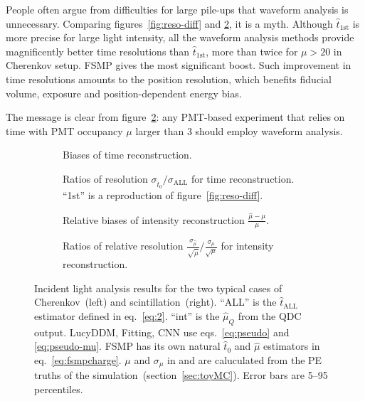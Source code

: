 People often argue from difficulties for large pile-ups that waveform analysis is unnecessary.  Comparing figures~\ref{fig:reso-diff} and \ref{fig:deltamethods}, it is a myth.  Although $\hat{t}_\mathrm{1st}$ is more precise for large light intensity, all the waveform analysis methods provide magnificently better time resolutions than $\hat{t}_\mathrm{1st}$, more than twice for $\mu>20$ in Cherenkov setup.  FSMP gives the most significant boost.  Such improvement in time resolutions amounts to the position resolution, which benefits fiducial volume, exposure and position-dependent energy bias.

The message is clear from figure~\ref{fig:deltamethods}: any PMT-based experiment that relies on time with PMT occupancy $\mu$ larger than 3 should employ waveform analysis.

\begin{figure}[H]
  \begin{subfigure}[b]{\textwidth}
    \centering
    \resizebox{\textwidth}{!}{}
    \caption{\label{fig:biasmethods} Biases of time reconstruction.}
  \end{subfigure}
  \begin{subfigure}[b]{\textwidth}
    \centering
    \resizebox{\textwidth}{!}{}
    \caption{\label{fig:deltamethods} Ratios of resolution $\sigma_{\hat{t}_0}/\sigma_{\mathrm{ALL}}$ for time reconstruction. ``1st'' is a reproduction of figure~\ref{fig:reso-diff}.}
  \end{subfigure}
  \begin{subfigure}[b]{\textwidth}
    \centering
    \resizebox{\textwidth}{!}{}
    \caption{\label{fig:biasmu} Relative biases of intensity reconstruction $\frac{\hat{\mu} - \mu}{\mu}$.}
  \end{subfigure}
  \begin{subfigure}[b]{\textwidth}
    \centering
    \resizebox{\textwidth}{!}{}
    \caption{\label{fig:deltamu} Ratios of relative resolution $\frac{\sigma_{\hat{\mu}}}{\sqrt{\hat{\mu}}}/\frac{\sigma_\mu}{\sqrt{\mu}}$ for intensity reconstruction.}
  \end{subfigure}
  \caption{Incident light analysis results for the two typical cases of Cherenkov~(left) and scintillation~(right).  ``ALL'' is the $\hat{t}_\mathrm{ALL}$ estimator defined in eq.~\eqref{eq:2}. ``int'' is the $\hat{\mu}_Q$ from the QDC output.  LucyDDM, Fitting, CNN use eqs.~\eqref{eq:pseudo} and \eqref{eq:pseudo-mu}.  FSMP has its own natural $\hat{t}_0$ and $\hat{\mu}$ estimators in eq.~\eqref{eq:fsmpcharge}. $\mu$ and $\sigma_\mu$ in  and  are caluculated from the PE truths of the simulation~(section~\ref{sec:toyMC}). Error bars are 5--95 percentiles.}
\end{figure}

